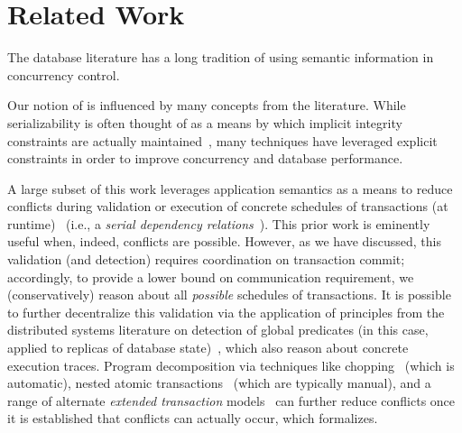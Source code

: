 
\section{Related Work}
\label{sec:relatedwork}


The database literature has a long tradition of using semantic
information in concurrency control.

 Our notion of \iconfluence is
influenced by many concepts from the literature. While serializability
is often thought of as a means by which implicit integrity constraints
are actually maintained~\cite{gray-virtues}, many techniques have
leveraged explicit constraints in order to improve concurrency and
database performance.

A large subset of this work leverages application semantics as a means
to reduce conflicts during validation or execution of concrete
schedules of transactions (at
runtime)~\cite{weihl-thesis,badrinath-semantics} (i.e., a
\textit{serial dependency relations}~\cite{herlihy-apologizing}). This
prior work is eminently useful when, indeed, conflicts are
possible. However, as we have discussed, this validation (and
detection) requires coordination on transaction commit; accordingly,
to provide a lower bound on communication requirement, we
(conservatively) reason about all \textit{possible} schedules of
transactions.  It is possible to further decentralize this validation
via the application of principles from the distributed systems
literature on detection of global predicates (in this case, applied to
replicas of database state)~\cite{globalpredicates}, which also reason
about concrete execution traces. Program decomposition via techniques
like chopping~\cite{chopping} (which is automatic), nested atomic
transactions~\cite{atomictransactions} (which are typically manual),
and a range of alternate \textit{extended transaction}
models~\cite{acta} can further reduce conflicts once it is established
that conflicts can actually occur, which \iconfluence
formalizes.

